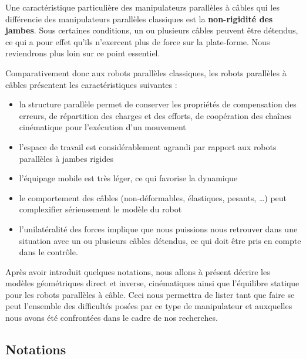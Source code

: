 Une caractéristique particulière des manipulateurs parallèles à câbles qui les 
différencie des manipulateurs parallèles classiques est la {\bf non-rigidité des 
jam\-bes}. Sous certaines conditions, un ou plusieurs câbles peuvent être 
détendus, ce qui a pour effet qu'ils n'exercent plus de force sur la 
plate-forme. Nous reviendrons plus loin sur ce point essentiel.

Comparativement donc aux robots parallèles classiques, les robots parallèles à 
câbles présentent les caractéristiques suivantes :
\begin{itemize}
 \item la structure parallèle permet de conserver les propriétés de compensation 
des erreurs, de répartition des charges et des efforts, de coopération des 
chaînes cinématique pour l'exécution d'un mouvement
 \item l'espace de travail est considérablement agrandi par rapport aux robots 
parallèles à jambes rigides
 \item l'équipage mobile est très léger, ce qui favorise la dynamique
 \item le comportement des câbles (non-déformables, élastiques, pesants, \dots) 
peut complexifier s\'erieusement le modèle du robot
 \item l'unilatéralité des forces implique que nous puissions nous retrouver 
dans une situation avec un ou plusieurs câbles détendus, ce qui doit être pris 
en compte dans le contrôle.
\end{itemize}

Après avoir introduit quelques notations, nous allons à présent décrire les 
modèles géométriques direct et inverse, cinématiques ainsi que l'équilibre 
statique pour les robots parallèles à câble. Ceci nous permettra de lister tant 
que faire se peut l'ensemble des difficultés posées par ce type de manipulateur 
et auxquelles nous avons été confrontées dans le cadre de nos recherches.

\subsection{Notations} \label{chap0-1-0}

\begin{figure}[!ht]
\centering
\def\svgwidth{.85\linewidth}

\end{figure}

